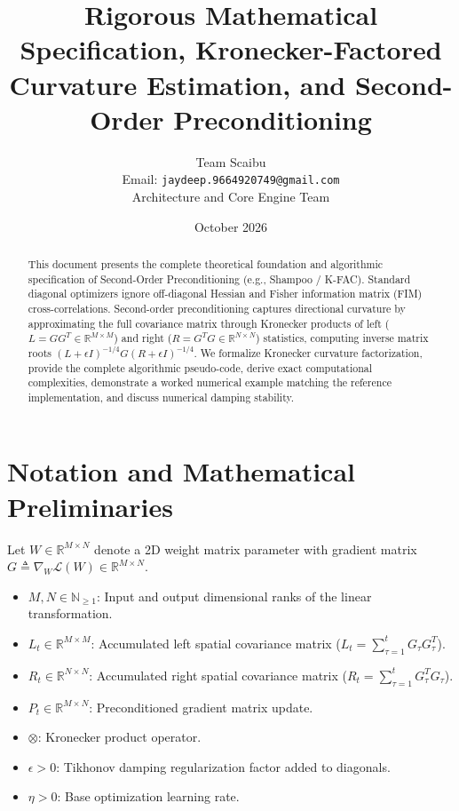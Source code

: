\documentclass[11pt,a4paper]{article}
\title{\textbf{Rigorous Mathematical Specification, Kronecker-Factored Curvature Estimation, and Second-Order Preconditioning}}
\author{Team Scaibu \\ \small Email: \texttt{jaydeep.9664920749@gmail.com} \\ \small Architecture and Core Engine Team}
\date{October 2026}
\theoremstyle{definition}
\begin{document}
\maketitle

\begin{abstract}
This document presents the complete theoretical foundation and algorithmic specification of Second-Order Preconditioning (e.g., Shampoo / K-FAC). Standard diagonal optimizers ignore off-diagonal Hessian and Fisher information matrix (FIM) cross-correlations. Second-order preconditioning captures directional curvature by approximating the full covariance matrix through Kronecker products of left ($L = G G^T \in \mathbb{R}^{M \times M}$) and right ($R = G^T G \in \mathbb{R}^{N \times N}$) statistics, computing inverse matrix roots $(L + \epsilon I)^{-1/4} G (R + \epsilon I)^{-1/4}$. We formalize Kronecker curvature factorization, provide the complete algorithmic pseudo-code, derive exact computational complexities, demonstrate a worked numerical example matching the reference implementation, and discuss numerical damping stability.
\end{abstract}

\section{Notation and Mathematical Preliminaries}

Let $W \in \mathbb{R}^{M \times N}$ denote a 2D weight matrix parameter with gradient matrix $G \triangleq \nabla_W \mathcal{L}(W) \in \mathbb{R}^{M \times N}$.

\begin{itemize}
    \item $M, N \in \mathbb{N}_{\ge 1}$: Input and output dimensional ranks of the linear transformation.
    \item $L_t \in \mathbb{R}^{M \times M}$: Accumulated left spatial covariance matrix ($L_t = \sum_{\tau=1}^t G_\tau G_\tau^T$).
    \item $R_t \in \mathbb{R}^{N \times N}$: Accumulated right spatial covariance matrix ($R_t = \sum_{\tau=1}^t G_\tau^T G_\tau$).
    \item $P_t \in \mathbb{R}^{M \times N}$: Preconditioned gradient matrix update.
    \item $\otimes$: Kronecker product operator.
    \item $\epsilon > 0$: Tikhonov damping regularization factor added to diagonals.
    \item $\eta > 0$: Base optimization learning rate.
\end{itemize}
\end{document}
